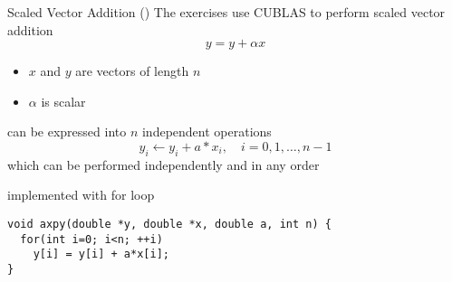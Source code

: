 \begin{frame}[fragile]{}
    \begin{info}{Scaled Vector Addition (\axpy)}
        The exercises use CUBLAS to perform scaled vector addition
            $$y = y + \alpha x$$
            \vspace{-15pt}
        \begin{itemize}
            \item $x$ and $y$ are vectors of length $n$
            \item $\alpha$ is scalar
        \end{itemize}
        \axpy can be expressed into $n$ independent operations
        $$y_i \leftarrow y_i + a*x_i,\quad i = {0, 1, \dots, n-1}$$
        which can be performed independently and in any order
    \end{info}

    \begin{code}{\axpy implemented with for loop}
        \begin{lstlisting}[style=boxcuda]
void axpy(double *y, double *x, double a, int n) {
  for(int i=0; i<n; ++i)
    y[i] = y[i] + a*x[i];
}
        \end{lstlisting}
    \end{code}

\end{frame}

